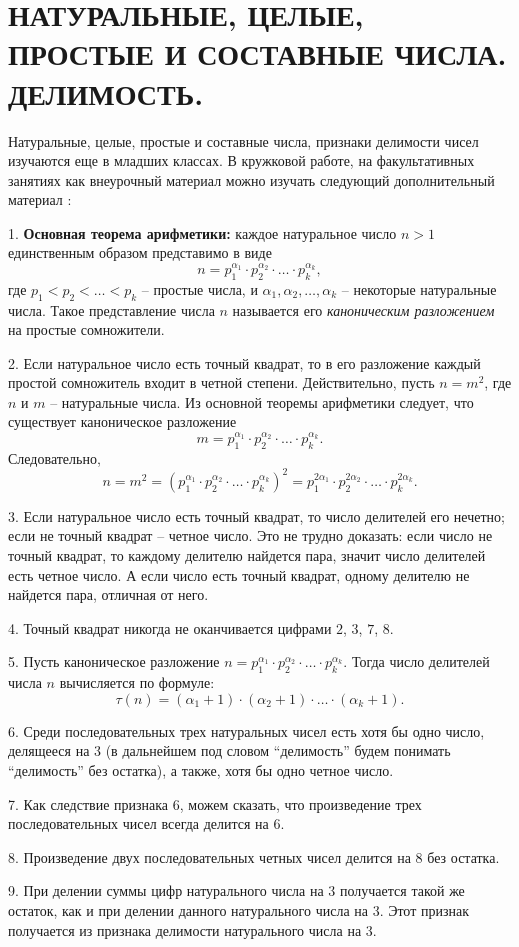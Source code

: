 \chapter{НАТУРАЛЬНЫЕ, ЦЕЛЫЕ, ПРОСТЫЕ И СОСТАВНЫЕ ЧИСЛА. ДЕЛИМОСТЬ.}

Натуральные, целые, простые и составные числа, признаки делимости чисел изучаются еще в младших классах. 
В кружковой работе, на факультативных занятиях как внеурочный материал можно изучать следующий дополнительный материал :

1. {\bf Основная теорема арифметики:} каждое натуральное число ${n > 1}$ единственным образом представимо в виде 
\[n = p_1^{\alpha_1}\cdot p_2^{\alpha_2}\cdot \ldots \cdot p_k^{\alpha_k},\] где $p_1 < p_2 < \ldots < p_k$ -- простые числа, и 
$\alpha_1, \alpha_2, \ldots, \alpha_k$ -- некоторые натуральные числа. Такое представление числа $n$ называется его {\it каноническим 
разложением} на простые сомножители.

2. Если натуральное число есть точный квадрат, то в его разложение каждый простой сомножитель входит в четной степени. Действительно, 
пусть ${n = m^2}$, где $n$ и $m$ -- натуральные числа. Из основной теоремы арифметики следует, что существует каноническое разложение
\[m = p_1^{\alpha_1}\cdot p_2^{\alpha_2} \cdot \ldots \cdot p_k^{\alpha_k}.\] Следовательно, \[n = m^2 = \left(p_1^{\alpha_1}\cdot p_2^{\alpha_2} 
\cdot \ldots \cdot p_k^{\alpha_k}\right)^2 = p_1^{2\alpha_1}\cdot p_2^{2\alpha_2} \cdot \ldots \cdot p_k^{2\alpha_k}.\]

3. Если натуральное число есть точный квадрат, то число делителей его нечетно; если не точный квадрат -- четное число. 
Это не трудно доказать: если число не точный квадрат, то каждому делителю найдется пара, значит число делителей 
есть четное число. А если число есть точный квадрат, одному делителю не найдется пара, отличная от него.

4. Точный квадрат никогда не оканчивается цифрами $2$, $3$, $7$, $8$.

5. Пусть каноническое разложение $n = p_1^{\alpha_1}\cdot p_2^{\alpha_2}\cdot \ldots \cdot p_k^{\alpha_k}$. Тогда число 
делителей числа $n$ вычисляется по формуле: \[\tau(n) = (\alpha_1 + 1)\cdot (\alpha_2 + 1)\cdot \ldots \cdot(\alpha_k + 1).\]

6. Среди последовательных трех натуральных чисел есть хотя бы одно число, делящееся на $3$ (в дальнейшем под словом “делимость” будем 
понимать “делимость” без остатка), а также, хотя бы одно четное число.

7. Как следствие признака $6$, можем сказать, что произведение трех последовательных чисел всегда делится на $6$.

8. Произведение двух последовательных четных чисел делится на $8$ без остатка.

9. При делении суммы цифр натурального числа на $3$ получается такой же остаток, как и при делении данного натурального числа на $3$.
Этот признак получается из признака делимости натурального числа на $3$.



